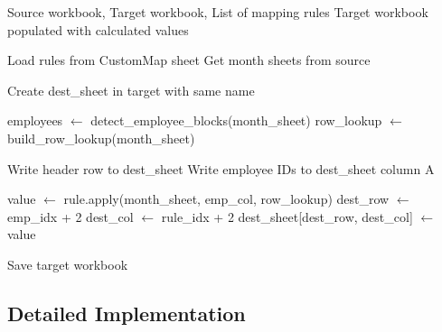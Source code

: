 \begin{algorithm}[H]
\caption{Apply All Mappings}
\begin{algorithmic}[1]
\Require Source workbook, Target workbook, List of mapping rules
\Ensure Target workbook populated with calculated values

\State Load rules from CustomMap sheet
\State Get month sheets from source

    \State Create dest\_sheet in target with same name
    
    \State employees $\gets$ detect\_employee\_blocks(month\_sheet)
    \State row\_lookup $\gets$ build\_row\_lookup(month\_sheet)
    
    \State Write header row to dest\_sheet
    \State Write employee IDs to dest\_sheet column A
    
            \State value $\gets$ rule.apply(month\_sheet, emp\_col, row\_lookup)
            \State dest\_row $\gets$ emp\_idx + 2
            \State dest\_col $\gets$ rule\_idx + 2
            \State dest\_sheet[dest\_row, dest\_col] $\gets$ value
        \EndFor
    \EndFor
    
    \State Save target workbook
\EndFor
\end{algorithmic}
\end{algorithm}

\subsection{Detailed Implementation}

